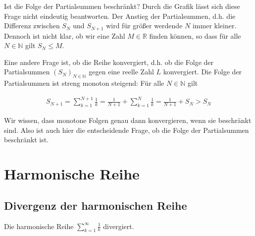 \documentclass[fontsize=9pt,
               parskip=half-,
               DIV=14,
               listof=chapterentry,
               tocflat]{scrbook}
\begin{document}
Ist die Folge der Partialsummen beschränkt? Durch die Grafik lässt sich diese Frage nicht eindeutig beantworten. Der Anstieg der Partialsummen, d.h. die Differenz zwischen $S_{N}$ und $S_{N+1}$ wird für größer werdende $N$ immer kleiner. Dennoch ist nicht klar, ob wir eine Zahl $M\in \mathbb {R} $ finden können, so dass für alle $N\in \mathbb {N} $ gilt $S_{N}\leq M$.

Eine andere Frage ist, ob die Reihe konvergiert, d.h. ob die Folge der Partialsummen $(S_{N})_{N\in \mathbb {N} }$ gegen eine reelle Zahl $L$ konvergiert. Die Folge der Partialsummen ist streng monoton steigend: Für alle $N\in \mathbb {N} $ gilt

\begin{align*}
S_{N+1}=\sum _{k=1}^{N+1}{\frac {1}{k}}={\frac {1}{N+1}}+\sum _{k=1}^{N}{\frac {1}{k}}={\frac {1}{N+1}}+S_{N}>S_{N}
\end{align*}

Wir wissen, dass monotone Folgen genau dann konvergieren, wenn sie beschränkt sind. Also ist auch hier die entscheidende Frage, ob die Folge der Partialsummen beschränkt ist.

\section{Harmonische Reihe}

\subsection{Divergenz der harmonischen Reihe}

\begin{theorem*}
Die harmonische Reihe $\sum _{k=1}^{\infty }{\frac {1}{k}}$ divergiert.

\end{theorem*}
\end{document}
